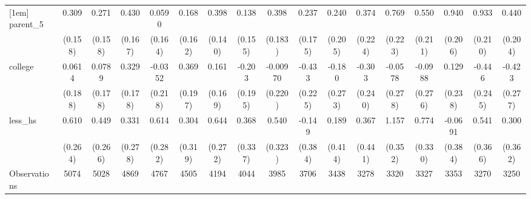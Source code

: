 {\begin{tabular}{l*{16}{c}}
[1em]
parent\_5            &       0.309         &       0.271         &       0.430\sym{*}  &      0.0590         &       0.168         &       0.398\sym{**} &       0.138         &       0.398\sym{*}  &       0.237         &       0.240         &       0.374         &       0.769\sym{***}&       0.550\sym{**} &       0.940\sym{***}&       0.933\sym{***}&       0.440\sym{*}  \\
                    &     (0.158)         &     (0.158)         &     (0.167)         &     (0.164)         &     (0.162)         &     (0.140)         &     (0.155)         &     (0.183)         &     (0.175)         &     (0.205)         &     (0.224)         &     (0.223)         &     (0.211)         &     (0.206)         &     (0.210)         &     (0.204)         \\
[1em]
college             &      0.0614         &      0.0789         &       0.329         &     -0.0352         &       0.369         &       0.161         &      -0.203         &    -0.00970         &      -0.433         &      -0.180         &      -0.303         &     -0.0578         &     -0.0988         &       0.129         &      -0.446         &      -0.423         \\
                    &     (0.188)         &     (0.178)         &     (0.178)         &     (0.218)         &     (0.197)         &     (0.169)         &     (0.195)         &     (0.220)         &     (0.225)         &     (0.273)         &     (0.240)         &     (0.278)         &     (0.276)         &     (0.238)         &     (0.245)         &     (0.277)         \\
[1em]
less\_hs             &       0.610\sym{*}  &       0.449         &       0.331         &       0.614\sym{*}  &       0.304         &       0.644\sym{*}  &       0.368         &       0.540         &      -0.149         &       0.189         &       0.367         &       1.157\sym{**} &       0.774\sym{*}  &     -0.0691         &       0.541         &       0.300         \\
                    &     (0.264)         &     (0.266)         &     (0.278)         &     (0.282)         &     (0.319)         &     (0.272)         &     (0.337)         &     (0.323)         &     (0.384)         &     (0.414)         &     (0.441)         &     (0.352)         &     (0.330)         &     (0.384)         &     (0.366)         &     (0.362)         \\
\hline
Observations        &        5074         &        5028         &        4869         &        4767         &        4505         &        4194         &        4044         &        3985         &        3706         &        3438         &        3278         &        3320         &        3327         &        3353         &        3270         &        3250         \\

\end{tabular}}
